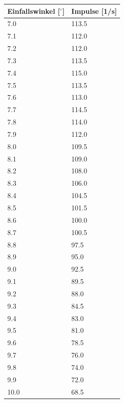 \begin{minipage}{\linewidth}
    \begin{table}[H]
        \centering
    \begin{tabular}{ll}
        \toprule
        Einfallswinkel [$^\circ$] & Impulse [1/s]  \\
        \midrule
        7.0	 & 113.5 \\
        7.1	 & 112.0 \\
        7.2	 & 112.0 \\
        7.3	 & 113.5 \\
        7.4	 & 115.0 \\
        7.5	 & 113.5 \\
        7.6	 & 113.0 \\
        7.7	 & 114.5 \\
        7.8	 & 114.0 \\
        7.9	 & 112.0 \\
        8.0	 & 109.5 \\
        8.1	 & 109.0 \\
        8.2	 & 108.0 \\
        8.3	 & 106.0 \\
        8.4	 & 104.5 \\
        8.5	 & 101.5 \\
        8.6	 & 100.0 \\
        8.7	 & 100.5 \\
        8.8	 & 97.5  \\
        8.9	 & 95.0  \\
        9.0	 & 92.5  \\
        9.1	 & 89.5  \\
        9.2	 & 88.0  \\
        9.3	 & 84.5  \\
        9.4	 & 83.0  \\
        9.5	 & 81.0  \\
        9.6	 & 78.5  \\
        9.7	 & 76.0  \\
        9.8	 & 74.0  \\
        9.9	 & 72.0  \\
        10.0 & 68.5  \\
        \bottomrule   
    \end{tabular}
    
    \label{tab:2}
\end{table}
\end{minipage}

